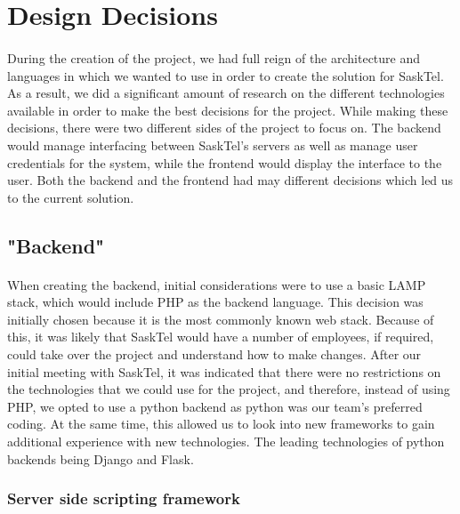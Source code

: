 \documentclass[12pt]{article}
\begin{document}

\newpage
\section{Design Decisions}
\paragraph{}
	During the creation of the project, we had full reign of the architecture and languages in which we wanted to use in order to create the solution for SaskTel. As a result, we did a significant amount of research on the different technologies available in order to make the best decisions for the project. While making these decisions, there were two different sides of the project to focus on. The backend would manage interfacing between SaskTel's servers as well as manage user credentials for the system, while the frontend would display the interface to the user. Both the backend and the frontend had may different decisions which led us to the current solution.
\subsection{"Backend"}
\paragraph{}
	When creating the backend, initial considerations were to use a basic LAMP stack, which would include PHP as the backend language. This decision was initially chosen because it is the most commonly known web stack. Because of this, it was likely that SaskTel would have a number of employees, if required, could take over the project and understand how to make changes. After our initial meeting with SaskTel, it was indicated that there were no restrictions on the technologies that we could use for the project, and therefore, instead of using PHP, we opted to use a python backend as python was our team's preferred coding. At the same time, this allowed us to look into new frameworks to gain additional experience with new technologies. The leading technologies of python backends being Django and Flask.

	\subsubsection{Server side scripting framework}
\end{document}
